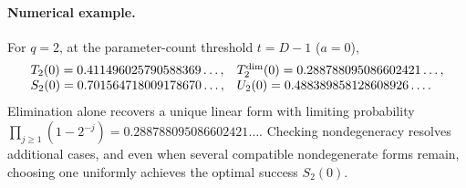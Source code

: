\paragraph{Numerical example.}
For $q=2$, at the parameter-count threshold $t=D-1$ ($a=0$),
\[
 \begin{array}{ll}
 T_2(0)=0.411496025790588369\ldots,&
 T_2^{\rm dim}(0)=0.288788095086602421\ldots,\\
 S_2(0)=0.701564718009178670\ldots,&
 U_2(0)=0.488389858128608926\ldots.
 \end{array}
\]
Elimination alone recovers a unique linear form with limiting probability
$\prod_{j\ge1}(1-2^{-j})=0.288788095086602421\ldots$. Checking nondegeneracy resolves
additional cases, and even when several compatible nondegenerate forms
remain, choosing one uniformly achieves the optimal success $S_2(0)$.
